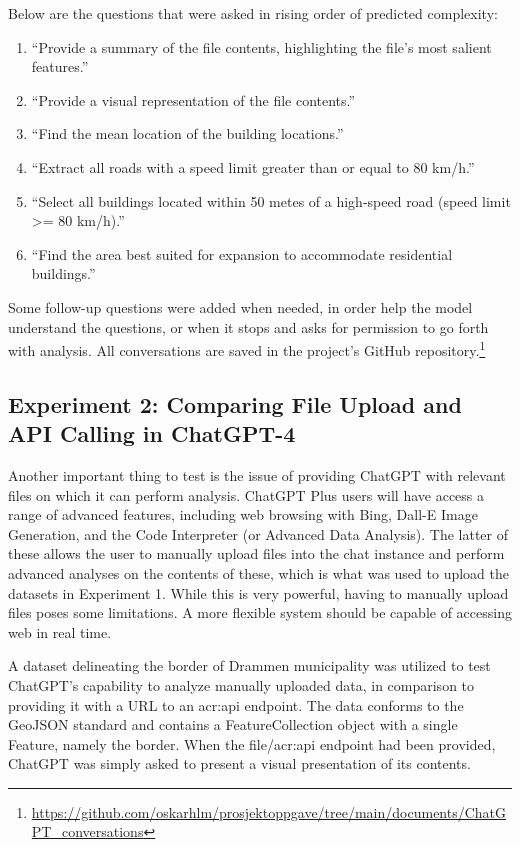 Below are the questions that were asked in rising order of predicted complexity:

\begin{enumerate}
    \item \enquote{Provide a summary of the file contents, highlighting the file's most salient features.}
    \item \enquote{Provide a visual representation of the file contents.}
    \item \enquote{Find the mean location of the building locations.}
    \item \enquote{Extract all roads with a speed limit greater than or equal to 80 km/h.}
    \item \enquote{Select all buildings located within 50 metes of a high-speed road (speed limit >= 80 km/h).}
    \item \enquote{Find the area best suited for expansion to accommodate residential buildings.}
\end{enumerate}
\label{enum:gpt-gis-questions}

Some follow-up questions were added when needed, in order help the model understand the questions, or when it stops and asks for permission to go forth with analysis. All conversations are saved in the project's GitHub repository.\footnote{\url{https://github.com/oskarhlm/prosjektoppgave/tree/main/documents/ChatGPT_conversations}}

\subsection{Experiment 2: Comparing File Upload and API Calling in ChatGPT-4}

Another important thing to test is the issue of providing ChatGPT with relevant files on which it can perform analysis. ChatGPT Plus users will have access a range of advanced features, including web browsing with Bing, Dall-E Image Generation, and the Code Interpreter (or Advanced Data Analysis). The latter of these allows the user to manually upload files into the chat instance and perform advanced analyses on the contents of these, which is what was used to upload the datasets in Experiment 1. While this is very powerful, having to manually upload files poses some limitations. A more flexible system should be capable of accessing web  in real time.

A dataset delineating the border of Drammen municipality was utilized to test ChatGPT's capability to analyze manually uploaded data, in comparison to providing it with a URL to an \acrshort{acr:api} endpoint. The data conforms to the GeoJSON standard and contains a FeatureCollection object with a single Feature, namely the border. When the file/\acrshort{acr:api} endpoint had been provided, ChatGPT was simply asked to present a visual presentation of its contents.


